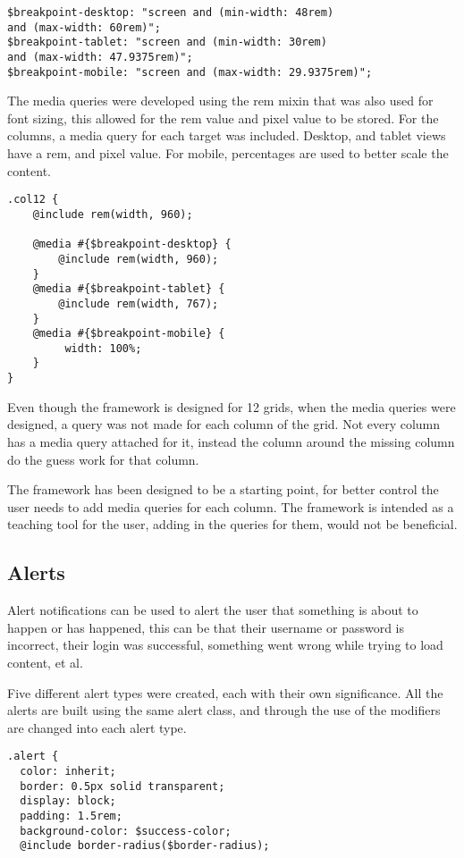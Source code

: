 \begin{lstlisting}[language=CSS3]
$breakpoint-desktop: "screen and (min-width: 48rem) 
and (max-width: 60rem)";
$breakpoint-tablet: "screen and (min-width: 30rem) 
and (max-width: 47.9375rem)";
$breakpoint-mobile: "screen and (max-width: 29.9375rem)";
\end{lstlisting}

The media queries were developed using the rem mixin that was also used for font sizing, this allowed for the rem value and pixel value to be stored. For the columns, a media query for each target was included. Desktop, and tablet views have a rem, and pixel value. For mobile, percentages are used to better scale the content.

\newpage
\begin{lstlisting}[language=CSS3]
.col12 {
	@include rem(width, 960);

	@media #{$breakpoint-desktop} {
		@include rem(width, 960);
	}
	@media #{$breakpoint-tablet} {
		@include rem(width, 767);
	}
	@media #{$breakpoint-mobile} {
		 width: 100%;
	}
}
\end{lstlisting}

Even though the framework is designed for 12 grids, when the media queries were designed, a query was not made for each column of the grid. Not every column has a media query attached for it, instead the column around the missing column do the guess work for that column. 

The framework has been designed to be a starting point, for better control the user needs to add media queries for each column. The framework is intended as a teaching tool for the user, adding in the queries for them, would not be beneficial. 

\newpage
\subsection*{Alerts}
Alert notifications can be used to alert the user that something is about to happen or has happened, this can be that their username or password is incorrect, their login was successful, something went wrong while trying to load content, et al.

Five different alert types were created, each with their own significance. All the alerts are built using the same alert class, and through the use of the modifiers are changed into each alert type. 

\begin{lstlisting}[language=CSS3]
.alert {
  color: inherit;
  border: 0.5px solid transparent;
  display: block;
  padding: 1.5rem;
  background-color: $success-color;
  @include border-radius($border-radius);
\end{lstlisting}

